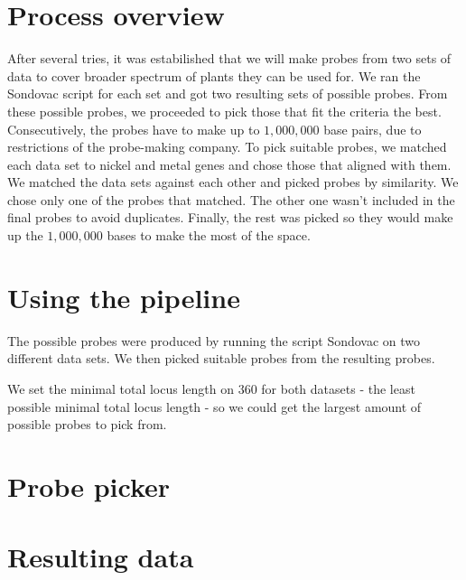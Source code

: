 \section{Process overview}
After several tries, it was estabilished that we will make probes from two sets of data to cover broader spectrum of plants they can 
be used for. We ran the Sondovac script for each set and got two resulting sets of possible probes. From these possible probes, we 
proceeded to pick those that fit the criteria the best. Consecutively, the probes have to make up to $1,000,000$ base pairs, due to 
restrictions of the probe-making company. 
To pick suitable probes, we matched each data set to nickel and metal genes and chose those that aligned with them. We matched the 
data sets against each other and picked probes by similarity. We chose only one of the probes that matched. The other one 
wasn't included in the final probes to avoid duplicates. Finally, the rest was picked so they would make up the $1,000,000$ bases to 
make the most of the space. 


\section{Using the pipeline}
The possible probes were produced by running the script Sondovac on two different data sets. We then picked suitable probes from 
the resulting probes. 

We set the minimal total locus length on $360$ for both datasets - the least possible minimal total locus length - so we could get 
the largest amount of possible probes to pick from. 


\section{Probe picker}

\section{Resulting data}

